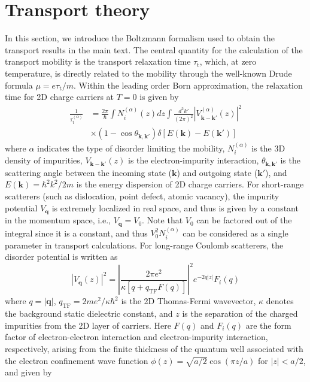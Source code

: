 \documentclass[aps,prmaterials,twocolumn,superscriptaddress,longbibliography]{revtex4-2}
\begin{document}
\section{Transport theory}\label{app:A}
In this section, we introduce the Boltzmann formalism used to obtain the transport results in the main text.
The central quantity for the calculation of the transport mobility is the transport relaxation time $\tau_\mathrm{t}$, which, at zero temperature, is directly related to the mobility through the well-known Drude formula $\mu = e \tau_\mathrm{t} / m$. Within the leading order Born approximation, the relaxation time for 2D charge carriers at $T=0$ is given by  
\begin{equation} \label{eq:transport_relaxation_time}
\begin{aligned}
    \frac{1}{\tau_\mathrm{t}^{(\alpha)}}&=\frac{2\pi}{\hbar} \int N_i^{(\alpha)}(z) dz \int  \frac{d^2 k'}{(2\pi)^2} \left| V^{(\alpha)}_{\bm k- \bm k'}(z) \right|^2 \\
    &\times (1-\cos{ \theta_{\bm k, \bm k'} })\delta[E(\bm k)-E(\bm k')]
\end{aligned}
\end{equation}
where $\alpha$ indicates the type of disorder limiting the mobility, $N_i^{(\alpha)}$ is the 3D density of impurities, $V_{\bm k - \bm k'}(z)$ is the electron-impurity interaction, $\theta_{\bm k, \bm k'}$ is the scattering angle between the incoming state ($\bm k$) and outgoing state ($\bm k'$), and $E(\bm k)=\hbar^2k^2/2m$ is the energy dispersion of 2D charge carriers. For short-range scatterers (such as dislocation, point defect, atomic vacancy), the impurity potential $V_{\bm q}$ is extremely localized in real space, and thus is given by a constant in the momentum space, i.e.,  $V_{\bm q}=V_0$. Note that $V_0$ can be factored out of the integral since it is a constant, and thus $V^2_0 N_i^{(\alpha)}$ can be considered as a single parameter in transport calculations. For long-range Coulomb scatterers, the disorder potential is written as
\begin{equation}
    \left|V_{\bm q}(z)\right|^2 = \left| \frac{2\pi e^2}{\kappa [q + q_\mathrm{TF}F(q) ]}\right|^2e^{-2q |z|} F_i(q)
\end{equation}
where $q= |\bm q|$, $q_\mathrm{TF}=2me^2/\kappa\hbar^2$ is the 2D Thomas-Fermi wavevector, $\kappa$ denotes the background static dielectric constant, and $z$ is the separation of the charged impurities from the 2D layer of carriers. Here $F(q)$ and $F_i(q)$ are the form factor of electron-electron interaction and electron-impurity interaction, respectively, arising from the finite thickness of the quantum well associated with the electron confinement wave function $\phi(z)=\sqrt{a/2}\cos{(\pi z/a)}$ for $|z|<a/2$, and given by \cite{hwang2013electronic}
\end{document}
